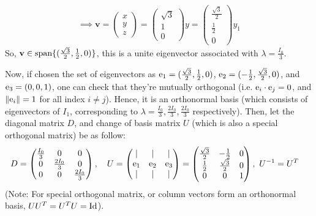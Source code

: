 \documentclass{article}
\newcommand{\Id}{\textmd{Id}} %
\newcommand{\be}{\textmd{e}}
\newcommand{\bv}{\textbf{v}} %
\begin{document}
\begin{itemize}
\begin{align}
    \end{align}
    \begin{align}
        \implies \bv=\begin{pmatrix}
            x\\y\\z
        \end{pmatrix}=\begin{pmatrix}
            \sqrt{3}\\1\\0
        \end{pmatrix}y = \begin{pmatrix}
            \frac{\sqrt{3}}{2}\\\frac{1}{2}\\0
        \end{pmatrix}y_1
    \end{align}
    So, $\bv\in \textmd{span}\{(\frac{\sqrt{3}}{2},\frac{1}{2},0)\}$, this is a unite eigenvector associated with $\lambda = \frac{I_0}{3}$.
\end{itemize}
Now, if chosen the set of eigenvectors as $\be_1 = (\frac{\sqrt{3}}{2},\frac{1}{2},0)$, $\be_2=(-\frac{1}{2},\frac{\sqrt{3}}{2},0)$, and $\be_3 = (0,0,1)$, one can check that they're mutually orthogonal (i.e. $\be_i \cdot \be_j = 0$, and $\|\be_i\|=1$ for all index $i\neq j$). Hence, it is an orthonormal basis (which consists of eigenvectors of $I_1$, corresponding to $\lambda=\frac{I_0}{3},\frac{2I_0}{3},\frac{2I_0}{3}$ respectively). Then, let the diagonal matrix $D$, and change of basis matrix $U$ (which is also a special orthogonal matrix) be as follow:
\begin{align}
    &D=\begin{pmatrix}
        \frac{I_0}{3}&0&0\\
        0&\frac{2I_0}{3}&0\\
        0&0&\frac{2I_0}{3}
    \end{pmatrix}, \quad U = \begin{pmatrix}
        | & |&|\\
        \be_1&\be_2&\be_3\\
        |&|&|
    \end{pmatrix} = \begin{pmatrix}
        \frac{\sqrt{3}}{2}&-\frac{1}{2}&0\\
        \frac{1}{2}&\frac{\sqrt{3}}{2}&0\\
        0&0&1
    \end{pmatrix}, \ U^{-1}=U^T
\end{align}
(Note: For special orthogonal matrix, or column vectors form an orthonormal basis, $UU^T = U^TU = \Id$). 
\end{document}
